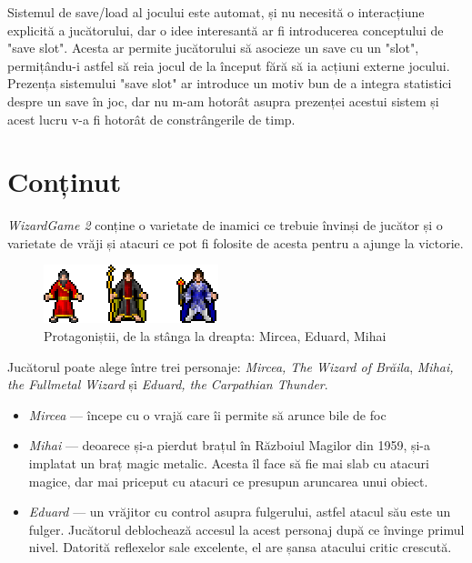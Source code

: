 \documentclass{article}
\begin{document}
    Sistemul de save/load al jocului este automat, și nu necesită o interacțiune explicită a
    jucătorului, dar o idee interesantă ar fi introducerea conceptului de "save slot". Acesta ar
    permite jucătorului să asocieze un save cu un "slot", permițându-i astfel să reia jocul de la
    început fără să ia acțiuni externe jocului. Prezența sistemului "save slot" ar introduce un motiv
    bun de a integra statistici despre un save în joc, dar nu m-am hotorât asupra prezenței acestui
    sistem și acest lucru v-a fi hotorât de constrângerile de timp.

    \section{Conținut}
    \label{sec:content}

    \emph{WizardGame 2} conține o varietate de inamici ce trebuie învinși de
    jucător și o varietate de vrăji și atacuri ce pot fi folosite de acesta pentru a ajunge
    la victorie.

    \label{sec:sprites}
    \begin{figure}[h]
        \includegraphics[scale=2]{player-characters}
        \centering
        \caption{Protagoniștii, de la stânga la dreapta: Mircea, Eduard, Mihai}
    \end{figure}

    Jucătorul poate alege între trei personaje: \emph{Mircea, The Wizard of Brăila},
    \emph{Mihai, the Fullmetal Wizard} și \emph{Eduard, the Carpathian Thunder}.
    \begin{itemize}
        \item \emph{Mircea} --- începe cu o vrajă care îi permite să arunce bile de foc
        \item \emph{Mihai} --- deoarece și-a pierdut brațul în Războiul Magilor din 1959,
        și-a implatat un braț magic metalic. Acesta îl face să fie mai slab cu atacuri
        magice, dar mai priceput cu atacuri ce presupun aruncarea unui obiect.
        \item \emph{Eduard} --- un vrăjitor cu control asupra fulgerului, astfel atacul
        său este un fulger. Jucătorul deblochează accesul la acest personaj după ce
        învinge primul nivel. Datorită reflexelor sale excelente, el are șansa atacului critic crescută.
    \end{itemize}
\end{document}
